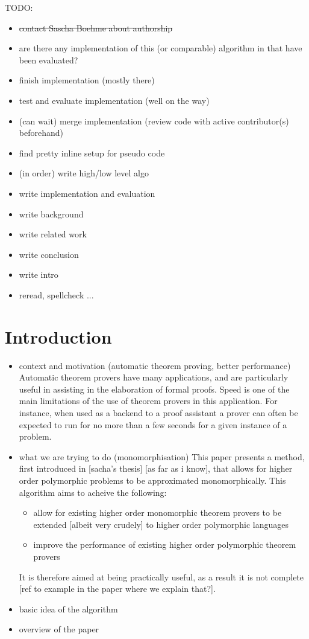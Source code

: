 \documentclass{article}
\begin{document}
TODO:
    \begin{itemize}
       \item \st{contact Sascha Boehme about authorship}
        \item are there any implementation of this (or comparable) algorithm in that have been evaluated?
        \item finish implementation (mostly there)
        \item test and evaluate implementation (well on the way)
        \item (can wait) merge implementation (review code with active contributor(s) beforehand)
        \item find pretty inline setup for pseudo code
        \item (in order) write high/low level algo
        \item write implementation and evaluation
        \item write background
        \item write related work
        \item write conclusion
        \item write intro
        \item reread, spellcheck ...
    \end{itemize}

\section{Introduction}
\begin{itemize}
    \item context and motivation (automatic theorem proving, better performance)
       Automatic theorem provers have many applications, and are particularly useful in assisting in the elaboration of formal proofs. Speed is one of the main limitations of the use of theorem provers in this application. For instance, when used as a backend to a proof assistant a prover can often be expected to run for no more than a few seconds for a given instance of a problem.
    \item what we are trying to do (monomorphisation)
       This paper presents a method, first introduced in [sacha's thesis] [as far as i know], that allows for higher order polymorphic problems to be approximated monomorphically. This algorithm aims to acheive the following:
         \begin{itemize}
            \item allow for existing higher order monomorphic theorem provers to be extended [albeit very crudely] to higher order polymorphic languages
            \item improve the performance of existing higher order polymorphic theorem provers
         \end{itemize}

         It is therefore aimed at being practically useful, as a result it is not complete [ref to example in the paper where we explain that?]. 

    \item basic idea of the algorithm 
    \item overview of the paper
\end{itemize}
\end{document}
